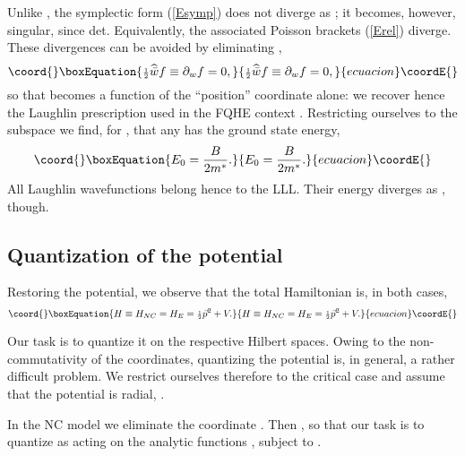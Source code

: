\documentclass[a4paper,11pt]{article}
\providecommand{\half}{{\scriptstyle{\frac{1}{2}}}}
\providecommand{\vx}{{\vec x}}
\def\p{{\partial}}
\def\vp{{\vec p}}
\def\vx{{\vec x}}
\begin{document}
Unlike \coordHE{}, the symplectic form (\ref{Esymp}) does not
diverge as \coordHE{}; it becomes, however,
singular,  since det\coordHE{}.
Equivalently, the associated Poisson brackets (\ref{Erel}) diverge.
These divergences can be avoided by eliminating \coordHE{},
\begin{equation}\coord{}\boxEquation{
\half\widehat{\bar{w}}f\equiv\p_{w}f=0,
\label{Econd}
}{
\half\widehat{\bar{w}}f\equiv\p_{w}f=0,
}{ecuacion}\coordE{}\end{equation}
so that \coordHE{} becomes a function of
the ``position'' coordinate \coordHE{} alone: we recover  hence the
Laughlin prescription used in the FQHE context
\cite{QHE}.
Restricting ourselves to the subspace \myHighlight{$\p_{w}f=0$}\coordHE{}
  we find, for \coordHE{},
that  any \coordHE{} has the ground state energy,
\begin{equation}\coord{}\boxEquation{
     E_{0}=\frac{B}{2m^*}.
\label{Egroundenergy}
}{
     E_{0}=\frac{B}{2m^*}.
}{ecuacion}\coordE{}\end{equation}
All Laughlin wavefunctions belong hence to the LLL.
Their energy diverges as \coordHE{}, though.
\goodbreak

\subsection{Quantization of the potential}
\label{quantization}

Restoring the potential, we observe that
  the  total Hamiltonian is, in both cases,
\begin{equation}\coord{}\boxEquation{
H\equiv H_{NC}=H_{E}=\half{\vp^2}+V.
\label{hamiltonian}
}{
H\equiv H_{NC}=H_{E}=\half{\vp^2}+V.
}{ecuacion}\coordE{}\end{equation}

  Our task is to quantize it on the respective Hilbert spaces.
  Owing to the non-commutativity of the coordinates,
quantizing the potential \coordHE{}
is, in general, a rather difficult
problem. We restrict ourselves therefore to the critical case
\coordHE{} and assume that the potential is radial,
\coordHE{}.


In the NC model we eliminate the coordinate \coordHE{}. Then
\myHighlight{$\vert\vx\vert^2=\vert\vp\vert^2/B^2=\bar{w}w/B$}\coordHE{}, so that
our task is to quantize
\coordHE{} as acting on the analytic functions
\coordHE{}, subject to \coordHE{}.
\end{document}
